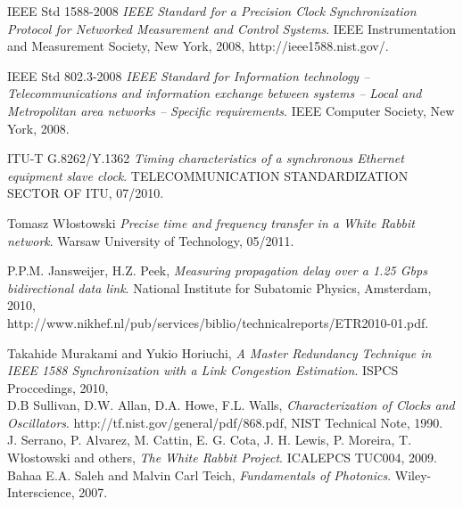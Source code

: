 \documentclass[a4paper, 12pt]{article}
\begin{document}
\newpage


\begin{thebibliography}{9}



  IEEE Std 1588-2008
  \emph{IEEE Standard for a Precision Clock Synchronization Protocol for Networked Measurement and 
Control Systems}.
  IEEE Instrumentation and Measurement Society, New York,
  2008,
  http://ieee1588.nist.gov/.

  IEEE Std 802.3-2008
  \emph{IEEE Standard for Information technology -- Telecommunications and information exchange 
	between systems -- Local and Metropolitan area networks -- Specific requirements}.
  IEEE Computer Society, New York,
  2008.

  ITU-T G.8262/Y.1362
  \emph{Timing characteristics of a synchronous
  Ethernet equipment slave clock}.
  TELECOMMUNICATION STANDARDIZATION SECTOR OF ITU, 
  07/2010.

  Tomasz W\l{}ostowski
  \emph{Precise time and frequency transfer in a White Rabbit network}.
  Warsaw University of Technology, 
  05/2011.

  P.P.M. Jansweijer, H.Z. Peek,
  \emph{Measuring propagation delay over a 1.25 Gbps bidirectional data link}.
  National Institute for Subatomic Physics, Amsterdam,
  2010,\\
  http://www.nikhef.nl/pub/services/biblio/technicalreports/ETR2010-01.pdf.

  Takahide Murakami and Yukio Horiuchi,
  \emph{A Master Redundancy Technique in IEEE 1588 Synchronization with a Link Congestion
  Estimation}.
  ISPCS Proccedings,
  2010,\\

  D.B Sullivan, D.W. Allan, D.A. Howe, F.L. Walls,
  \emph{Characterization of Clocks and Oscillators}.
  http://tf.nist.gov/general/pdf/868.pdf, 
  NIST Technical Note,
  1990.\\

  J. Serrano, P. Alvarez, M. Cattin, E. G. Cota, J. H. Lewis, P. Moreira, T. W\l{}ostowski
  and others,
  \emph{The White Rabbit Project}.
  ICALEPCS TUC004,
  2009.\\

  Bahaa E.A. Saleh and Malvin Carl Teich,
  \emph{Fundamentals of Photonics}.
  Wiley-Interscience,
  2007.\\

\end{thebibliography}
\end{document}
